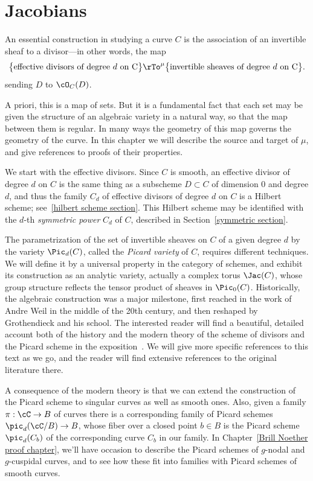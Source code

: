 

\chapter{Jacobians}\label{Jacobians chapter}\label{new Jacobians chapter}\label{JacobianChapter}


An essential construction in studying a curve $C$ is the association of an invertible sheaf to a divisor---in other words, the map
$$
\big\{ \text{effective divisors of degree $d$ on C}\big\} \rTo^\mu \big\{ \text{invertible sheaves of degree $d$ on C} \big\}.
$$
sending $D$ to $\cO_C(D)$.

A priori, this is a map of sets. But it is a fundamental fact that each set may  be given the structure of an algebraic variety in a natural way, so that the map between them is regular. In many ways the geometry of this map governs the geometry of the curve.
In this chapter we will describe the source and target of $\mu$, and give references to proofs of their properties. 

We start with the effective divisors. Since $C$ is smooth, an effective divisor of degree $d$ on $C$ is the same thing as a subscheme $D \subset C$ of dimension 0 and degree $d$, and thus
the family $C_d$ of effective divisors of degree $d$ on $C$ is a Hilbert scheme; see~\ref{hilbert scheme section}. This Hilbert scheme may be identified with
the $d$-th \emph{symmetric power} $C_d$  of $C$, described in Section~\ref{symmetric section}. 

The parametrization of the set of invertible sheaves on $C$ of a given degree $d$ by the variety $\Pic_d(C)$, called the \emph{Picard variety} of $C$, requires different techniques. We will define it by a universal property in the category of schemes, and exhibit its construction as an analytic variety, actually a complex torus $\Jac(C)$, whose group structure reflects the tensor product of
sheaves in $\Pic_0(C)$.
Historically, the algebraic construction was a major milestone, first reached in the work of Andre Weil in the middle of
the 20th century, and then reshaped by Grothendieck and his school. The interested reader will find a beautiful, detailed account both of the history and the 
modern theory of the scheme of divisors and the Picard scheme in the exposition~\cite{Kleiman-PicardScheme}. We will give
more specific references to this text as we go, and the reader will find extensive references to the original literature there.

A consequence of the modern theory is that we can extend the construction of the Picard scheme to singular curves as well as smooth ones. Also, given a family $\pi : \cC \to B$ of curves there is a corresponding family of Picard schemes $\pic_d(\cC/B) \to B$, whose fiber over a closed point $b\in B$ is the Picard scheme $\pic_d(C_b)$ of the corresponding curve $C_b$ in our family.
In Chapter~\ref{Brill Noether proof chapter}, we'll have occasion to describe the Picard schemes of $g$-nodal and $g$-cuspidal curves, and to see how these fit into families with Picard schemes of smooth curves.

